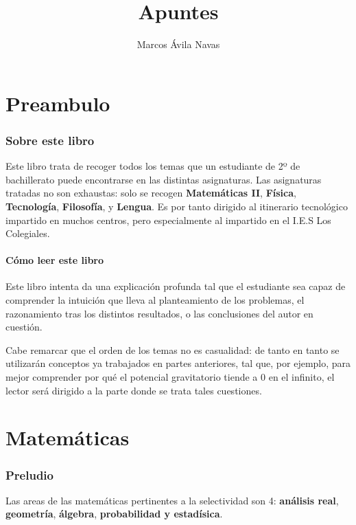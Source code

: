 \documentclass[10pt]{article}
\title{Apuntes}
\author{Marcos Ávila Navas}
\affiliation{I.E.S. Los Colegiales}
\begin{document}
\maketitle

\flushbottom
\newpage
\pagestyle{fancynotes}

\part{Preambulo}

\section{Sobre este libro}

Este libro trata de recoger todos los temas que un estudiante de 2º de bachillerato puede encontrarse en las distintas asignaturas. Las asignaturas tratadas no son exhaustas: solo se recogen
\textbf{Matemáticas II}, \textbf{Física}, \textbf{Tecnología}, \textbf{Filosofía}, y \textbf{Lengua}. Es por tanto dirigido al itinerario tecnológico impartido en muchos centros, pero especialmente al impartido
en el I.E.S Los Colegiales.

\subsection{Cómo leer este libro}

Este libro intenta da una explicación profunda tal que el estudiante sea capaz de comprender la intuición que lleva al planteamiento de los problemas, el razonamiento tras los distintos resultados,
o las conclusiones del autor en cuestión.

Cabe remarcar que el orden de los temas no es casualidad: de tanto en tanto se utilizarán conceptos ya trabajados en partes anteriores, tal que, por ejemplo, para mejor comprender por qué el
potencial gravitatorio tiende a 0 en el infinito, el lector será dirigido a la parte donde se trata tales cuestiones.

\newpage

\part{Matemáticas}

\section{Preludio}

Las areas de las matemáticas pertinentes a la selectividad son 4: \textbf{análisis real}, \textbf{geometría}, \textbf{álgebra}, \textbf{probabilidad y estadísica}.
\end{document}
